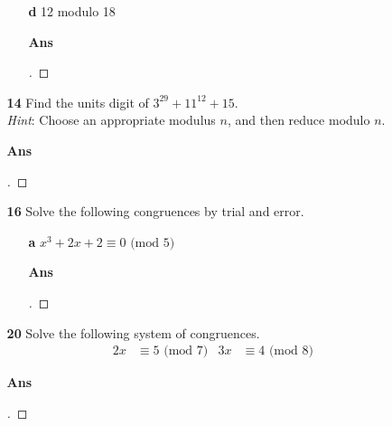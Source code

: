 \documentclass[paper=usletter, fontsize=12pt]{article}
\begin{document}
\begin{itemize}
\begin{itemize}
\begin{itemize}
                \item[\textbf{d}] 12 modulo 18
                \item[\textbf{Ans}]
                \begin{proof}[\unskip\nopunct]
                \end{proof}
                \vspace{0.2in}

            \end{itemize}

            \item[\textbf{14}] Find the units digit of $3^{29}+11^{12}+15$.\\
            \textit{Hint}: Choose an appropriate modulus $n$, and then reduce
            modulo $n$.
            \item[\textbf{Ans}]
            \begin{proof}[\unskip\nopunct]
            \end{proof}
            \vspace{0.2in}

            \item[\textbf{16}] Solve the following congruences by trial and
            error.
            \begin{itemize}

                \item[\textbf{a}] $x^3+2x+2 \equiv 0 \text{ (mod  5)}$
                \item[\textbf{Ans}]
                \begin{proof}[\unskip\nopunct]
                \end{proof}
                \vspace{0.2in}

            \end{itemize}

            \item[\textbf{20}] Solve the following system of congruences.
            \begin{align*}
                2x & \equiv 5 \text{ (mod  7)} & 3x & \equiv 4 \text{ (mod  8)}
            \end{align*}
            \item[\textbf{Ans}]
            \begin{proof}[\unskip\nopunct]
            \end{proof}
            \vspace{0.2in}

        \end{itemize}


\end{itemize}
\end{document}
